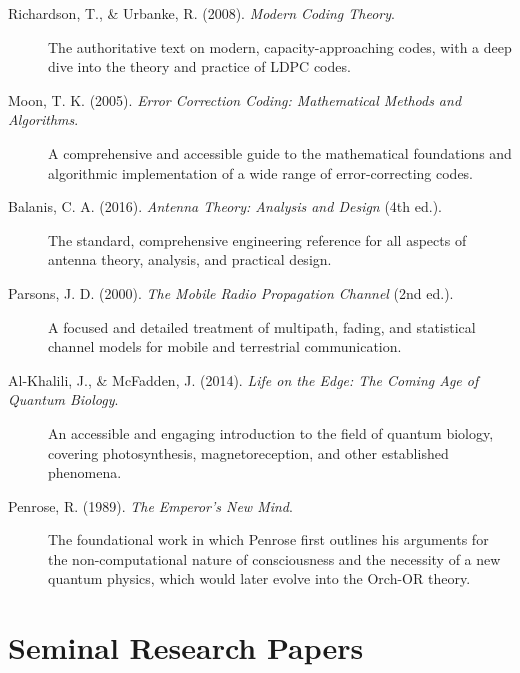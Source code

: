\begin{description}
    \item[Richardson, T., \& Urbanke, R. (2008). \emph{Modern Coding Theory}.] The authoritative text on modern, capacity-approaching codes, with a deep dive into the theory and practice of LDPC codes.
    \item[Moon, T. K. (2005). \emph{Error Correction Coding: Mathematical Methods and Algorithms}.] A comprehensive and accessible guide to the mathematical foundations and algorithmic implementation of a wide range of error-correcting codes.
\end{description}

\begin{description}
    \item[Balanis, C. A. (2016). \emph{Antenna Theory: Analysis and Design} (4th ed.).] The standard, comprehensive engineering reference for all aspects of antenna theory, analysis, and practical design.
    \item[Parsons, J. D. (2000). \emph{The Mobile Radio Propagation Channel} (2nd ed.).] A focused and detailed treatment of multipath, fading, and statistical channel models for mobile and terrestrial communication.
\end{description}

\begin{description}
    \item[Al-Khalili, J., \& McFadden, J. (2014). \emph{Life on the Edge: The Coming Age of Quantum Biology}.] An accessible and engaging introduction to the field of quantum biology, covering photosynthesis, magnetoreception, and other established phenomena.
    \item[Penrose, R. (1989). \emph{The Emperor's New Mind}.] The foundational work in which Penrose first outlines his arguments for the non-computational nature of consciousness and the necessity of a new quantum physics, which would later evolve into the Orch-OR theory.
\end{description}

\section{Seminal Research Papers}

